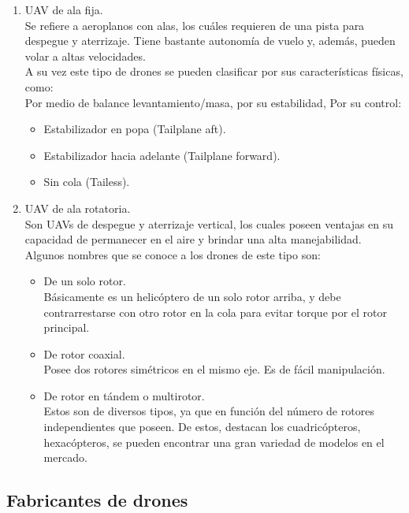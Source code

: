\begin{enumerate}
	\item UAV de ala fija. \\
	Se refiere a aeroplanos con alas, los cuáles requieren de una pista para 
	despegue y aterrizaje. Tiene bastante autonomía de vuelo y, además, 
	pueden volar a altas velocidades. \\
	A su vez este tipo de drones se pueden clasificar por sus 
	características físicas, como:  \\
	Por medio de balance levantamiento/masa, por su estabilidad, Por su 
	control:

	\begin{itemize}
		\item Estabilizador en popa (Tailplane aft).
		\item Estabilizador hacia adelante (Tailplane forward).
		\item Sin cola (Tailess).
	\end{itemize}

	\item UAV de ala rotatoria. \\
	Son UAVs de despegue y aterrizaje vertical, los cuales poseen ventajas 
	en su capacidad de permanecer en el aire y brindar una alta 
	manejabilidad. \\
	Algunos nombres que se conoce a los drones de este tipo son:

	\begin{itemize}
		\item De un solo rotor. \\
		Básicamente es un helicóptero de un solo rotor arriba, y debe 
		contrarrestarse con otro rotor en la cola para evitar torque por 
		el rotor principal.
		\item De rotor coaxial. \\
		Posee dos rotores simétricos en el mismo eje. Es de fácil 
		manipulación.
		\item De rotor en tándem o multirotor. \\
		Estos son de diversos tipos, ya que en función del número de 
		rotores independientes que poseen. De estos, destacan los 
		cuadricópteros, hexacópteros, se pueden encontrar una gran 
		variedad de modelos en el mercado.  
	\end{itemize}

\end{enumerate}

%
\subsection{Fabricantes de drones}

